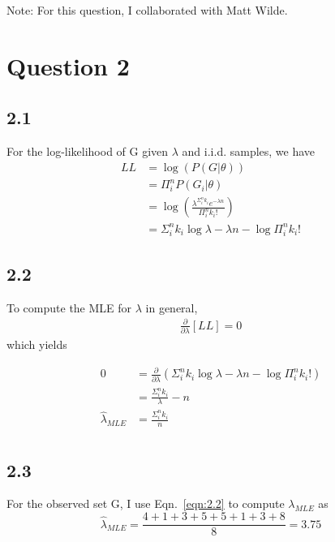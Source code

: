 \documentclass[12pt]{amsart}
\begin{document}
Note: For this question, I collaborated with Matt Wilde.

\section*{Question 2}

\subsection*{2.1}

For the log-likelihood of G given $\lambda$ and i.i.d. samples, we have
\begin{equation} \label{eqn:2.1}
\begin{split}
LL & = \log \left( P(G | \theta)  \right) \\
& = \Pi_i^n P(G_i | \theta) \\
& = \log \left( \frac{\lambda^{\Sigma_i^n k_i} e^{-\lambda n}}{\Pi_i^n k_i !} \right) \\
& = \Sigma_i^n k_i \log \lambda - \lambda n - \log \Pi_i^n k_i !
\end{split}
\end{equation}

\subsection*{2.2}

To compute the MLE for $\lambda$ in general,
\begin{equation} 
\begin{split}
\frac{\partial}{\partial \lambda} \left[ LL \right] = 0
\end{split}
\end{equation}
which yields

\begin{equation} \label{eqn:2.2}
\begin{split}
0 & = \frac{\partial}{\partial \lambda} \left( \Sigma_i^n k_i \log \lambda - \lambda n - \log \Pi_i^n k_i ! \right) \\ 
& = \frac{\Sigma_i^n k_i}{\lambda} - n \\
\hat{\lambda}_{MLE} & = \frac{\Sigma_i^n k_i}{n} \\
\end{split}
\end{equation}

\subsection*{2.3}
For the observed set G, I use Eqn.~\ref{eqn:2.2} to compute $\lambda_{MLE}$ as
\begin{equation}
\hat{\lambda}_{MLE} = \frac{4+1+3+5+5+1+3+8}{8} = 3.75
\end{equation}
\end{document}
